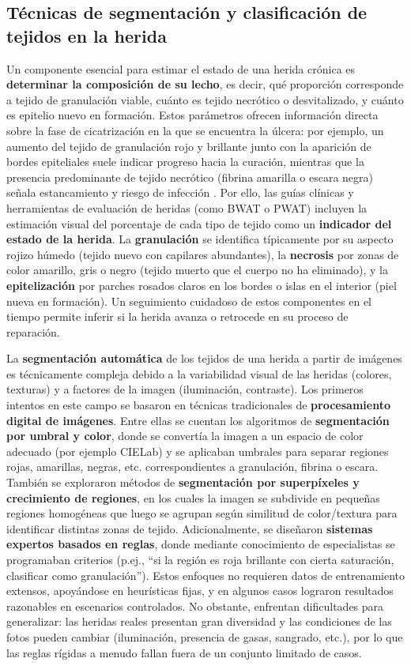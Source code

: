 \subsection{Técnicas de segmentación y clasificación de tejidos en la herida}

Un componente esencial para estimar el estado de una herida crónica es \textbf{determinar la composición de su lecho}, es decir, qué proporción corresponde a tejido de granulación viable, cuánto es tejido necrótico o desvitalizado, y cuánto es epitelio nuevo en formación. Estos parámetros ofrecen información directa sobre la fase de cicatrización en la que se encuentra la úlcera: por ejemplo, un aumento del tejido de granulación rojo y brillante junto con la aparición de bordes epiteliales suele indicar progreso hacia la curación, mientras que la presencia predominante de tejido necrótico (fibrina amarilla o escara negra) señala estancamiento y riesgo de infección \cite{ulcerasCicatrizacixF3nxDAlcerasnet}. Por ello, las guías clínicas y herramientas de evaluación de heridas (como BWAT o PWAT) incluyen la estimación visual del porcentaje de cada tipo de tejido como un \textbf{indicador del estado de la herida}. La \textbf{granulación} se identifica típicamente por su aspecto rojizo húmedo (tejido nuevo con capilares abundantes), la \textbf{necrosis} por zonas de color amarillo, gris o negro (tejido muerto que el cuerpo no ha eliminado), y la \textbf{epitelización} por parches rosados claros en los bordes o islas en el interior (piel nueva en formación). Un seguimiento cuidadoso de estos componentes en el tiempo permite inferir si la herida avanza o retrocede en su proceso de reparación. 

La \textbf{segmentación automática} de los tejidos de una herida a partir de imágenes es técnicamente compleja debido a la variabilidad visual de las heridas (colores, texturas) y a factores de la imagen (iluminación, contraste). Los primeros intentos en este campo se basaron en técnicas tradicionales de \textbf{procesamiento digital de imágenes}. Entre ellas se cuentan los algoritmos de \textbf{segmentación por umbral y color}, donde se convertía la imagen a un espacio de color adecuado (por ejemplo CIELab) y se aplicaban umbrales para separar regiones rojas, amarillas, negras, etc. correspondientes a granulación, fibrina o escara. También se exploraron métodos de \textbf{segmentación por superpíxeles y crecimiento de regiones}, en los cuales la imagen se subdivide en pequeñas regiones homogéneas que luego se agrupan según similitud de color/textura para identificar distintas zonas de tejido. Adicionalmente, se diseñaron \textbf{sistemas expertos basados en reglas}, donde mediante conocimiento de especialistas se programaban criterios (p.ej., “si la región es roja brillante con cierta saturación, clasificar como granulación”). Estos enfoques no requieren datos de entrenamiento extensos, apoyándose en heurísticas fijas, y en algunos casos lograron resultados razonables en escenarios controlados. No obstante, enfrentan dificultades para generalizar: las heridas reales presentan gran diversidad y las condiciones de las fotos pueden cambiar (iluminación, presencia de gasas, sangrado, etc.), por lo que las reglas rígidas a menudo fallan fuera de un conjunto limitado de casos. 

